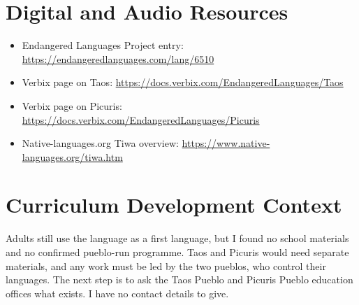 \documentclass[12pt]{article}
\begin{document}
\section{Digital and Audio Resources}
\begin{itemize}
\item Endangered Languages Project entry: \url{https://endangeredlanguages.com/lang/6510}
\item Verbix page on Taos: \url{https://docs.verbix.com/EndangeredLanguages/Taos}
\item Verbix page on Picuris: \url{https://docs.verbix.com/EndangeredLanguages/Picuris}
\item Native-languages.org Tiwa overview: \url{https://www.native-languages.org/tiwa.htm}
\end{itemize}

\section{Curriculum Development Context}
Adults still use the language as a first language, but I found no school materials and no confirmed pueblo-run programme. Taos and Picuris would need separate materials, and any work must be led by the two pueblos, who control their languages. The next step is to ask the Taos Pueblo and Picuris Pueblo education offices what exists. I have no contact details to give.
\end{document}
